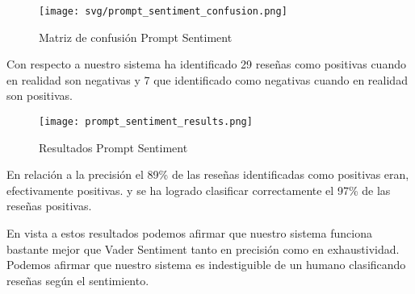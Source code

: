 \begin{figure}[h]
   \advance{} 
   \texttt{[image: svg/prompt\_sentiment\_confusion.png]}
   \caption{Matriz de confusión Prompt Sentiment}
\end{figure}
Con respecto a nuestro sistema ha identificado 29 reseñas como positivas 
cuando en realidad son negativas y 7 que identificado como negativas 
cuando en realidad son positivas.


\begin{figure}[h]
   \advance{} 
   \texttt{[image: prompt\_sentiment\_results.png]}
   \caption{Resultados Prompt Sentiment}
\end{figure}
En relación a la precisión el 89\% de las reseñas identificadas como positivas eran, efectivamente positivas.
y se ha logrado clasificar correctamente el 97\% de las reseñas positivas.

En vista a estos resultados podemos afirmar que nuestro sistema funciona bastante 
mejor que Vader Sentiment tanto en precisión como en exhaustividad. 
Podemos afirmar que nuestro sistema es indestiguible de un humano clasificando 
reseñas según el sentimiento.



